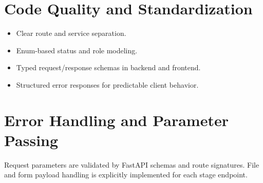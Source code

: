 \section{Code Quality and Standardization}
\begin{itemize}
\item Clear route and service separation.
\item Enum-based status and role modeling.
\item Typed request/response schemas in backend and frontend.
\item Structured error responses for predictable client behavior.
\end{itemize}

\section{Error Handling and Parameter Passing}
Request parameters are validated by FastAPI schemas and route signatures. File and form payload handling is explicitly implemented for each stage endpoint.
